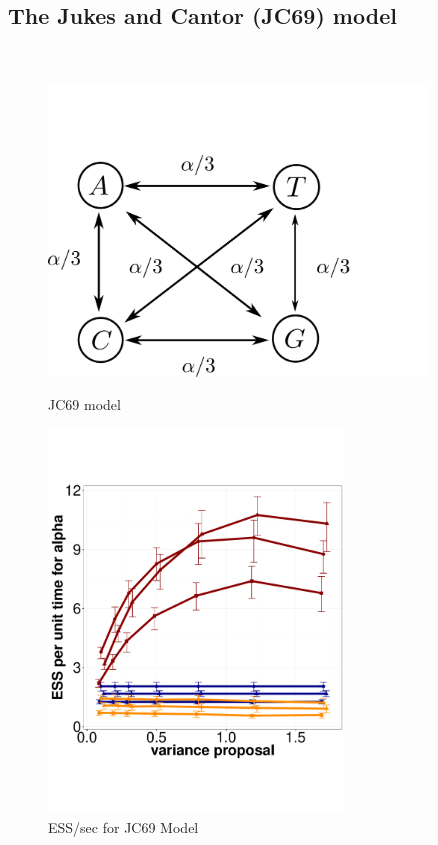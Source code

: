   \subsection{The Jukes and Cantor (JC69) model}~
  \begin{figure}%
  \centering
  \begin{minipage}[!hp]{0.45\linewidth}
  \centering
    \includegraphics [width=0.90\textwidth, angle=0]{figs/jc_model.pdf}
    \caption{JC69 model}
	\label{jc_model}
  \end{minipage}
  \begin{minipage}[!hp]{0.45\linewidth}
  \centering
    \includegraphics [width=0.70\textwidth, angle=0]{figs/jc.pdf}
    \vspace{-0.6in}
    \caption{ESS/sec for JC69 Model }
     \label{fig:ESS_JC}
  \end{minipage}
  \end{figure}

